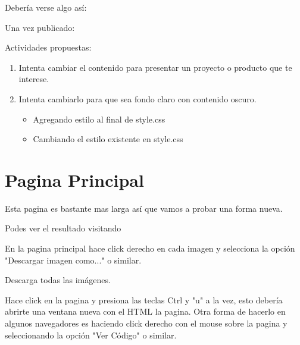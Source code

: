 \documentclass[letterpaper,10pt,spanish]{sphinxmanual}
\begin{document}
Debería verse algo así:

\begin{figure}[htbp]
\centering

\noindent{}
\end{figure}

Una vez publicado:

\begin{figure}[htbp]
\centering

\noindent{}
\end{figure}

Actividades propuestas:
\begin{enumerate}
\item {} 
Intenta cambiar el contenido para presentar un proyecto o producto que te interese.

\item {} 
Intenta cambiarlo para que sea fondo claro con contenido oscuro.
\begin{itemize}
\item {} 
Agregando estilo al final de style.css

\item {} 
Cambiando el estilo existente en style.css

\end{itemize}

\end{enumerate}


\section{Pagina Principal}
\label{\detokenize{reusando-html-de-otros:pagina-principal}}
Esta pagina es bastante mas larga así que vamos a probar una forma nueva.

Podes ver el resultado visitando 

En la pagina principal hace click derecho en cada imagen y selecciona la opción
"Descargar imagen como..." o similar.

Descarga todas las imágenes.

Hace click en la pagina y presiona las teclas Ctrl y "u" a la vez, esto debería
abrirte una ventana nueva con el HTML la pagina. Otra forma de hacerlo en algunos
navegadores es haciendo click derecho con el mouse sobre la pagina y seleccionando
la opción "Ver Código" o similar.
\end{document}

